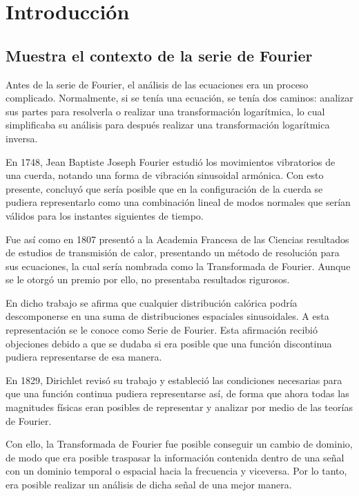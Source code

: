 \section{Introducción}

\subsection{Muestra el contexto de la serie de Fourier}

Antes de la serie de Fourier, el análisis de las ecuaciones era un proceso complicado. Normalmente, si se tenía una ecuación, se tenía dos caminos: analizar sus partes para resolverla o realizar una transformación logarítmica, lo cual simplificaba su análisis para después realizar una transformación logarítmica inversa.

En 1748, Jean Baptiste Joseph Fourier estudió los movimientos vibratorios de una cuerda, notando una forma de vibración sinusoidal armónica. Con esto presente, concluyó que sería posible que en la configuración de la cuerda se pudiera representarlo como una combinación lineal de modos normales que serían válidos para los instantes siguientes de tiempo.

Fue así como en 1807 presentó a la Academia Francesa de las Ciencias resultados de estudios de transmisión de calor, presentando un método de resolución para sus ecuaciones, la cual sería nombrada como la Transformada de Fourier. Aunque se le otorgó un premio por ello, no presentaba resultados rigurosos.

En dicho trabajo se afirma que cualquier distribución calórica podría descomponerse en una suma de distribuciones espaciales sinusoidales. A esta representación se le conoce como Serie de Fourier. Esta afirmación recibió objeciones debido a que se dudaba si era posible que una función discontinua pudiera representarse de esa manera.

En 1829, Dirichlet revisó su trabajo y estableció las condiciones necesarias para que una función continua pudiera representarse así, de forma que ahora todas las magnitudes físicas eran posibles de representar y analizar por medio de las teorías de Fourier.

Con ello, la Transformada de Fourier fue posible conseguir un cambio de dominio, de modo que era posible traspasar la información contenida dentro de una señal con un dominio temporal o espacial hacia la frecuencia y viceversa. Por lo tanto, era posible realizar un análisis de dicha señal de una mejor manera.


